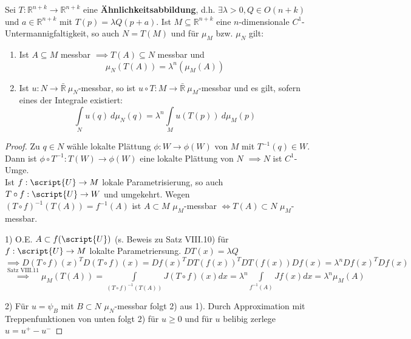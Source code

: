   \begin{lemma}
    Sei $T:\mathbb{R}^{n+k} \to \mathbb{R}^{n+k}$ eine \textbf{Ähnlichkeitsabbildung}, d.h. $\exists \lambda>0, Q\in O(n+k)$ und $a\in\mathbb{R}^{n+k}$ mit $T(p) = \lambda Q(p+a)$. Ist $M \subseteq \mathbb{R}^{n+k}$ eine $n$-dimensionale $C^1$-Untermannigfaltigkeit, so auch $N = T(M)$ und für $\mu_M$ bzw. $\mu_N$ gilt:
    \begin{enumerate}
      \item Ist $A \subseteq M$ messbar $\implies T(A) \subseteq N$ messbar und 
        $$\mu_N(T(A)) = \lambda^n (\mu_M(A))$$
      \item Ist $u: N \to \bar{\mathbb{R}} \ \mu_N$-messbar, so ist $u \circ T: M \to \bar{\mathbb{R}} \ \mu_M$-messbar und es gilt, sofern eines der Integrale existiert:
        $$\int\limits_N u(q) \ d\mu_N(q) = \lambda^n \int\limits_M u(T(p)) \ d\mu_M(p)$$
    \end{enumerate}
  \end{lemma}
  \begin{proof}
    Zu $q\in N$ wähle lokalte Plättung $\phi: W \to \phi(W)$ von $M$ mit $T^{-1}(q) \in W$. Dann ist $\phi \circ T^{-1}: T(W) \to \phi(W)$ eine lokalte Plättung von $N$ $\implies N$ ist $C^1$-Umge. \\
    Ist $f: \script{U} \to M$ lokale Parametrisierung, so auch $T\circ f: \script{U}\to W$ und umgekehrt. Wegen $(T\circ f)^{-1} (T(A)) = f^{-1}(A)$ ist $A\subset M$ $\mu_M$-messbar $\Leftrightarrow T(A) \subset N$ $\mu_M$-messbar. 
    \item[1)] O.E. $A\subset f(\script{U})$ (s. Beweis zu Satz VIII.10) für $f: \script{U}\to M$ lokalte Parametriersung. $DT(x) = \lambda Q$ \\
    $\implies D(T\circ f)(x)^T D(T\circ f)(x) = Df(x)^T DT(f(x))^T DT(f(x))Df(x) = \lambda^n Df(x)^T Df(x)$ \\
    $\overset{\text{Satz VIII.11}}{\implies} \mu_M (T(A)) = \int\limits_{(T\circ f)^{-1}(T(A))} J(T\circ f)(x) dx = \lambda^n\int\limits_{f^{-1}(A)}Jf(x) dx = \lambda^n \mu_M(A)$ 
    \item[2)] Für $u = \psi_B$ mit $B\subset N$ $\mu_N$-messbar folgt 2) aus 1).
    Durch Approximation mit Treppenfunktionen von unten folgt 2) für $u\geq 0$ und für $u$ belibig zerlege $u = u^+ - u^-$
  \end{proof}

